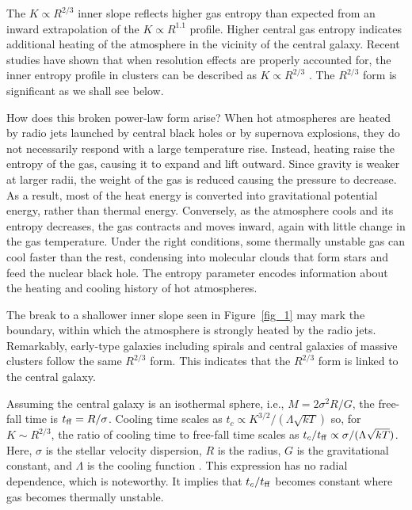 \documentclass[apjl]{emulateapj}
\begin{document}
The $K \propto R^{2/3}$  inner slope reflects higher gas entropy than expected from an inward extrapolation of the $K \propto R^{1.1}$ profile.  Higher central gas entropy indicates additional heating of the atmosphere in the vicinity of the central galaxy.  Recent studies have shown that when resolution effects are properly accounted for, the inner entropy profile in clusters can be described as $K \propto R^{2/3}$ \citep{Panagoulia:14, Hogan:17a}.  The $R^{2/3}$ form is significant as we shall see below.  

How does this broken power-law form arise? When hot atmospheres are heated by radio jets launched by central black holes or by supernova explosions, they do not necessarily respond with a large temperature rise. Instead, heating raise the entropy of the gas, causing it to expand and lift outward.  Since gravity is weaker at larger radii, the weight of the gas is reduced causing the pressure to decrease.  As a result, most of the heat energy is converted into gravitational potential energy, rather than thermal energy. Conversely, as the atmosphere cools and its entropy decreases, the gas contracts and moves inward, again with little change in the gas temperature.  Under the right conditions, some thermally unstable gas can cool faster than the rest, condensing into molecular clouds that form stars and feed the nuclear black hole. The entropy parameter encodes information about the heating and cooling history of hot atmospheres.  

The break to a shallower inner slope seen in Figure~\ref{fig_1} may mark the boundary, within which the atmosphere is strongly heated by the radio jets. Remarkably, early-type galaxies including spirals and central galaxies of massive clusters follow the same $R^{2/3}$ form.   This indicates that the
$R^{2/3}$ form is linked to the central galaxy.

Assuming the central galaxy is an isothermal sphere, i.e., $M = 2\sigma^2 R / G$, the free-fall time is $t_{\rm ff} = R / \sigma$.  Cooling time scales as $t_c \propto K^{3/2} / (\Lambda \sqrt{kT})$ so, for $K \sim R^{2/3}$, the ratio of cooling time to free-fall time scales as $t_c/t_{\rm ff} \propto \sigma / (\Lambda \sqrt{kT})$. Here, $\sigma$ is the stellar velocity dispersion, $R$ is the radius, $G$ is the gravitational constant, and  $\Lambda$ is the cooling function \citep{Hogan:17a}. This expression has no radial dependence, which is noteworthy.  It implies that $t_c/t_{\rm ff}$ becomes constant where gas becomes thermally unstable. 
\end{document}
